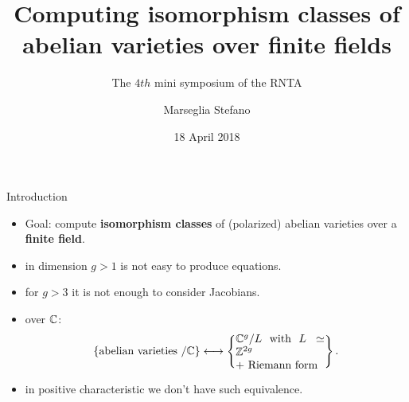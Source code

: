 \documentclass{beamer}
\title[]{Computing isomorphism classes of abelian varieties over finite fields}
\subtitle{The $4th$ mini symposium of the RNTA}
\author[Marseglia Stefano]{Marseglia Stefano}
\institute[]{Stockholms University}
\date{18 April 2018}
\begin{document}
\begin{frame}
\titlepage
\end{frame}


\begin{frame}{ Introduction }
\begin{itemize}
 \item Goal: compute \textbf{isomorphism classes} of (polarized) abelian varieties over a \textbf{finite field}.
 \pause \item in dimension $g>1$ is not easy to produce equations.
 \pause \item for $g>3$ it is not enough to consider Jacobians.
 \pause \item over $\mathbb{C}$:
 \[
      \set{ \text{abelian varieties $/\C$} } \longleftrightarrow 
      \set{\parbox[c]{8em}{$\C^g/L$ with $L\simeq \Z^{2g}$\\ $+$ Riemann form}}.
 \]
 \pause \vspace{-6mm} \item in positive characteristic we don't have such equivalence.
\end{itemize}
\end{frame}
\end{document}
